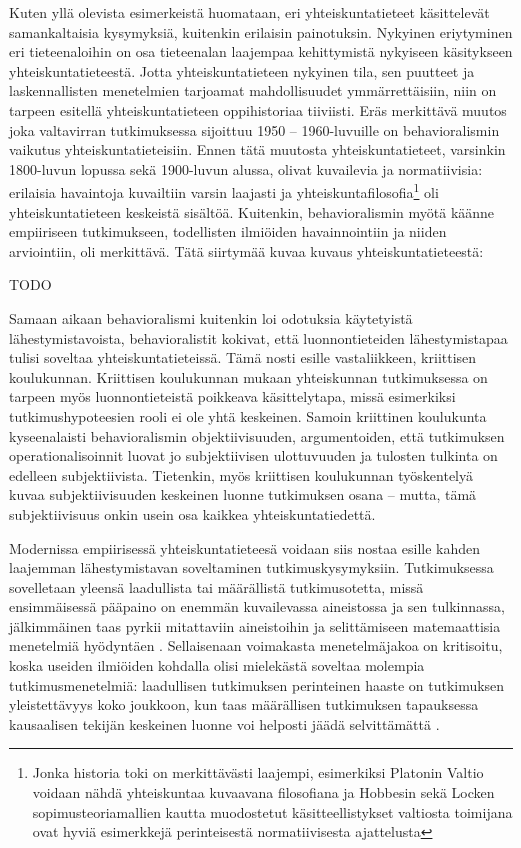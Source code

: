 \documentclass[finnish,gradu,twoside,12pt]{tktltiki}
\begin{document}
Kuten yllä olevista esimerkeistä huomataan, eri yhteiskuntatieteet käsittelevät samankaltaisia kysymyksiä, kuitenkin erilaisin painotuksin. Nykyinen eriytyminen eri tieteenaloihin on osa tieteenalan laajempaa kehittymistä nykyiseen käsitykseen yhteiskuntatieteestä. Jotta yhteiskuntatieteen nykyinen tila, sen puutteet ja laskennallisten menetelmien tarjoamat mahdollisuudet ymmärrettäisiin, niin on tarpeen esitellä yhteiskuntatieteen oppihistoriaa tiiviisti. Eräs merkittävä muutos joka valtavirran tutkimuksessa sijoittuu 1950 -- 1960-luvuille on behavioralismin vaikutus yhteiskuntatieteisiin. Ennen tätä muutosta yhteiskuntatieteet, varsinkin 1800-luvun lopussa sekä 1900-luvun alussa, olivat kuvailevia ja normatiivisia: erilaisia havaintoja kuvailtiin varsin laajasti \citep{x} ja yhteiskuntafilosofia\footnote{Jonka historia toki on merkittävästi laajempi, esimerkiksi Platonin Valtio voidaan nähdä yhteiskuntaa kuvaavana filosofiana ja Hobbesin sekä Locken sopimusteoriamallien kautta muodostetut käsitteellistykset valtiosta toimijana ovat hyviä esimerkkejä perinteisestä normatiivisesta ajattelusta} oli yhteiskuntatieteen keskeistä sisältöä. Kuitenkin, behavioralismin myötä käänne empiiriseen tutkimukseen, todellisten ilmiöiden havainnointiin ja niiden arviointiin, oli merkittävä. Tätä siirtymää kuvaa \citep[yy]{x} kuvaus yhteiskuntatieteestä:

TODO

Samaan aikaan behavioralismi kuitenkin loi odotuksia käytetyistä lähestymistavoista, behavioralistit kokivat, että luonnontieteiden lähestymistapaa tulisi soveltaa yhteiskuntatieteissä. Tämä nosti esille vastaliikkeen, kriittisen koulukunnan. Kriittisen koulukunnan mukaan yhteiskunnan tutkimuksessa on tarpeen myös luonnontieteistä poikkeava käsittelytapa, missä esimerkiksi tutkimushypoteesien rooli ei ole yhtä keskeinen. Samoin kriittinen koulukunta kyseenalaisti behavioralismin objektiivisuuden, argumentoiden, että tutkimuksen operationalisoinnit luovat jo subjektiivisen ulottuvuuden ja tulosten tulkinta on edelleen subjektiivista. Tietenkin, myös kriittisen koulukunnan työskentelyä kuvaa subjektiivisuuden keskeinen luonne tutkimuksen osana -- mutta, tämä subjektiivisuus onkin usein osa kaikkea yhteiskuntatiedettä.

Modernissa empiirisessä yhteiskuntatieteesä voidaan siis nostaa esille kahden laajemman lähestymistavan soveltaminen tutkimuskysymyksiin. Tutkimuksessa sovelletaan yleensä laadullista tai määrällistä tutkimusotetta, missä ensimmäisessä pääpaino on enemmän kuvailevassa aineistossa ja sen tulkinnassa, jälkimmäinen taas pyrkii mitattaviin aineistoihin ja selittämiseen matemaattisia menetelmiä hyödyntäen \citep{a,b}. Sellaisenaan voimakasta menetelmäjakoa on kritisoitu, koska useiden ilmiöiden kohdalla olisi mielekästä soveltaa molempia tutkimusmenetelmiä: laadullisen tutkimuksen perinteinen haaste on tutkimuksen yleistettävyys koko joukkoon, kun taas määrällisen tutkimuksen tapauksessa kausaalisen tekijän keskeinen luonne voi helposti jäädä selvittämättä \citep{a,b,c}.
\end{document}
